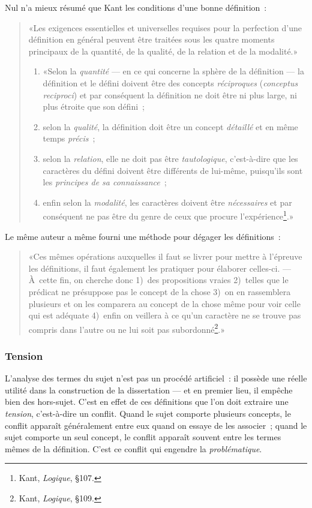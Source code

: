 \documentclass[a4paper,11pt]{article}
\newcommand{\cad}{c'est-à-dire}
\begin{document}
Nul n'a mieux résumé que Kant les conditions d'une bonne définition~:
\begin{quote}
  «Les exigences essentielles et universelles requises pour la
  perfection d'une définition en général peuvent être traitées sous les
  quatre moments principaux de la quantité, de la qualité, de la
  relation et de la modalité.»

  \begin{enumerate}
  \item «Selon la \emph{quantité} --- en ce qui concerne la sphère de la
    définition --- la définition et le défini doivent être des concepts
    \emph{réciproques} (\emph{conceptus reciproci}) et par conséquent la
    définition ne doit être ni plus large, ni plus étroite que son défini~;
  \item selon la \emph{qualité}, la définition doit être un concept
    \emph{détaillé} et en même temps \emph{précis}~;
  \item selon la \emph{relation}, elle ne doit pas être
    \emph{tautologique}, \cad{} que les caractères du défini doivent
    être différents de lui-même, puisqu'ils sont les \emph{principes de
      sa connaissance}~;
  \item enfin selon la \emph{modalité}, les caractères doivent être
    \emph{nécessaires} et par conséquent ne pas être du genre de ceux
    que procure l'expérience\footnote{Kant, \emph{Logique}, §107.}.»
  \end{enumerate}
\end{quote}
Le même auteur a même fourni une méthode pour dégager les définitions~: 
\begin{quote}
  «Ces mêmes opérations auxquelles il faut se livrer pour mettre à
  l'épreuve les définitions, il faut également les pratiquer pour
  élaborer celles-ci. --- À~cette fin, on cherche donc 1)~des
  propositions vraies 2)~telles que le prédicat ne présuppose pas le
  concept de la chose 3)~on en rassemblera plusieurs et on les comparera
  au concept de la chose même pour voir celle qui est adéquate 4)~enfin
  on veillera à ce qu'un caractère ne se trouve pas compris dans l'autre
  ou ne lui soit pas subordonné\footnote{Kant, \emph{Logique}, §109.}.»
\end{quote}

\subsubsection{Tension}

L'analyse des termes du sujet n'est pas un procédé artificiel~: il
possède une réelle utilité dans la construction de la dissertation ---
et en premier lieu, il empêche bien des hors-sujet. C'est en effet de
ces définitions que l'on doit extraire une \emph{tension}, \cad{} un
conflit. Quand le sujet comporte plusieurs concepts, le conflit apparaît
généralement entre eux quand on essaye de les associer~; quand le sujet
comporte un seul concept, le conflit apparaît souvent entre les termes
mêmes de la définition. C'est ce conflit qui engendre la
\emph{problématique}.
\end{document}
